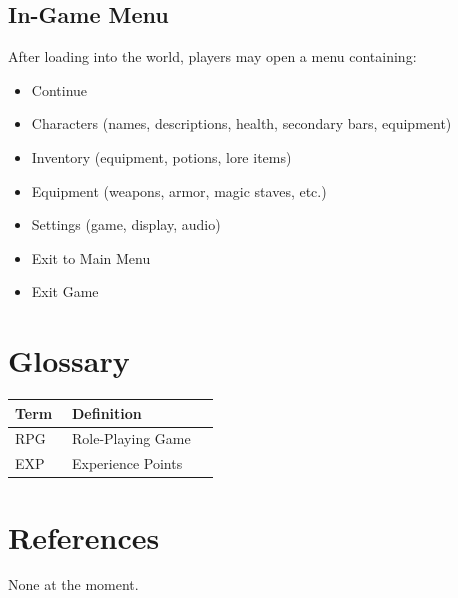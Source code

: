 \documentclass[12pt]{article}
\begin{document}
\subsection{In-Game Menu}
After loading into the world, players may open a menu containing:
\begin{itemize}
    \item Continue
    \item Characters (names, descriptions, health, secondary bars, equipment)
    \item Inventory (equipment, potions, lore items)
    \item Equipment (weapons, armor, magic staves, etc.)
    \item Settings (game, display, audio)
    \item Exit to Main Menu
    \item Exit Game
\end{itemize}

\section{Glossary}
\begin{longtable}{p{0.25\linewidth} p{0.65\linewidth}}
\textbf{Term} & \textbf{Definition} \\
\hline
RPG & Role-Playing Game \\
EXP & Experience Points \\
\end{longtable}

\section{References}
None at the moment.
\end{document}
